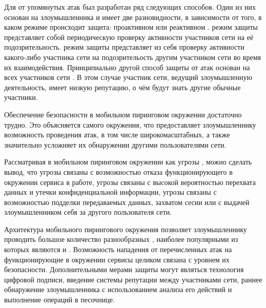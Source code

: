 %
Для  от упомянутых атак был разработан ряд следующих способов. 
%
Один из них основан на  злоумышленника и имеет две разновидности, в зависимости от того, в каком режиме происходит защита: проактивном или реактивном . 
%
 режим защиты представляет собой периодическую проверку активности участников сети на её подозрительность. 
%
 режим защиты представляет из себя проверку активности какого-либо участника сети на подозрительость другим участником сети во время их взаимодействия. 
%
Принципиально другой способ защиты от атак основан на  всех участников сети  .
%
В этом случае участник сети, ведущий злоумышленную деятельность, имеет низкую репутацию, о чём будут знать другие обычные участники. 



%
Обеспечение безопасности в мобильном пиринговом окружении достаточно трудно. 
%
Это объясняется  самого окружения, что предоставляет злоумышленнику возможность проведения атак, в том числе широкомасштабных, а также значительно усложняет их обнаружении другими пользователями сети.

%
Рассматривая  в мобильном пиринговом окружении как угрозы , можно сделать вывод, что угрозы  связаны с возможностью отказа функционирующего в окружении сервиса в работе, угрозы  связаны с высокой вероятностью перехвата данных и утечки конфиденциальной информации, угрозы  связаны с возможностью подделки передаваемых данных, захватом сесии или с выдачей злоумышленником себя за другого пользователя сети. 

%
Архитектура мобильного пирингового окружения позволяет злоумышленнику проводить большое количество разнообразных , наиболее популярными из которых являются  и . 
%
Возможность  нападения от перечисленных атак на функционирующие в окружении сервисы целиком связана с уровнем их безопасности. 
%
Дополнительными мерами защиты могут являться технология цифровой подписи, введение системы репутации между участниками сети, раннее обнаружение злоумышленника с использованием анализа его действий и выполнение операций в песочнице.